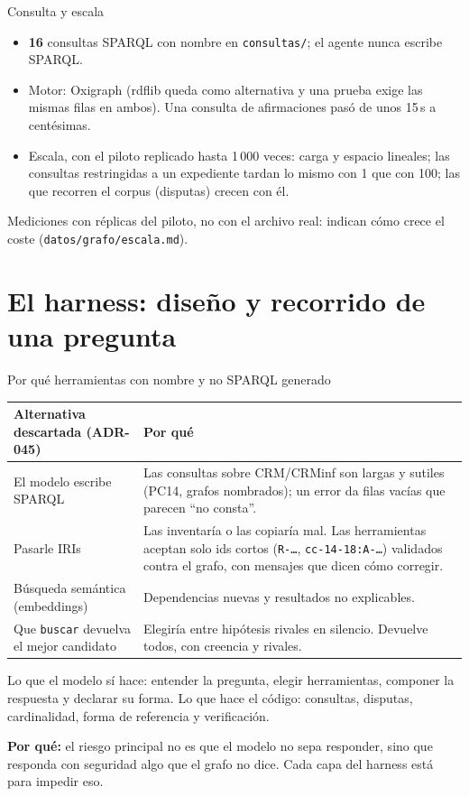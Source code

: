 \documentclass[aspectratio=169,10pt]{beamer}
\newcommand{\ttt}[1]{\texttt{\small #1}}
\newcommand{\cifra}[1]{\textbf{\alert{#1}}}
\newcommand{\porque}[1]{\par\smallskip\colorbox{ocre!10}{\parbox{\dimexpr\linewidth-2\fboxsep}{\footnotesize\textbf{Por qué:} #1}}}
\begin{document}
\begin{frame}{Consulta y escala}
\begin{itemize}
\item \cifra{16} consultas SPARQL con nombre en \ttt{consultas/}; el agente nunca escribe SPARQL.
\item Motor: \alert{Oxigraph} (rdflib queda como alternativa y una prueba exige las mismas filas en ambos).
      Una consulta de afirmaciones pasó de unos 15\,s a centésimas.
\item Escala, con el piloto replicado hasta 1\,000 veces: carga y espacio lineales; las consultas restringidas a un
      expediente tardan lo mismo con 1 que con 100; las que recorren el corpus (disputas) crecen con él.
\end{itemize}
\medskip
\footnotesize Mediciones con réplicas del piloto, no con el archivo real: indican cómo crece el coste
(\ttt{datos/grafo/escala.md}).
\end{frame}

\section{El harness: diseño y recorrido de una pregunta}

\begin{frame}[shrink=9]{Por qué herramientas con nombre y no SPARQL generado}
\small
\begin{tabular}{@{}p{4.4cm}p{8.8cm}@{}}
\toprule
Alternativa descartada (ADR-045) & Por qué \\
\midrule
El modelo escribe SPARQL & Las consultas sobre CRM/CRMinf son largas y sutiles (PC14, grafos nombrados); un error da
\alert{filas vacías que parecen \enquote{no consta}}. \\
Pasarle IRIs & Las inventaría o las copiaría mal. Las herramientas aceptan solo ids cortos (\ttt{R-…}, \ttt{cc-14-18:A-…})
\alert{validados} contra el grafo, con mensajes que dicen cómo corregir. \\
Búsqueda semántica (embeddings) & Dependencias nuevas y resultados no explicables. \\
Que \ttt{buscar} devuelva el mejor candidato & Elegiría entre hipótesis rivales en silencio. Devuelve \alert{todos}, con
creencia y rivales. \\
\bottomrule
\end{tabular}

\medskip
\footnotesize
Lo que el modelo sí hace: entender la pregunta, elegir herramientas, componer la respuesta y declarar su forma. Lo que
hace el código: consultas, disputas, cardinalidad, forma de referencia y verificación.
\porque{el riesgo principal no es que el modelo no sepa responder, sino que responda con seguridad algo que el grafo no
dice. Cada capa del harness está para impedir eso.}
\end{frame}
\end{document}
